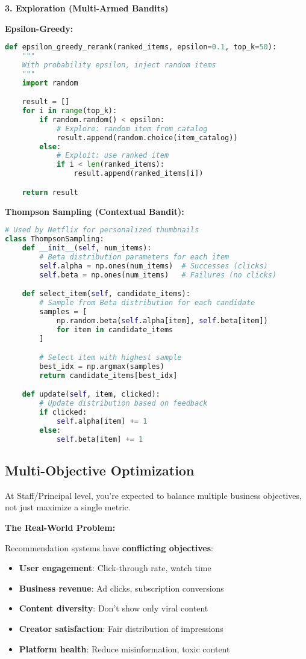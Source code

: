 \documentclass[10pt]{article}
\begin{document}
\textbf{3. Exploration (Multi-Armed Bandits)}

\textbf{Epsilon-Greedy:}
\begin{lstlisting}[language=Python]
def epsilon_greedy_rerank(ranked_items, epsilon=0.1, top_k=50):
    """
    With probability epsilon, inject random items
    """
    import random

    result = []
    for i in range(top_k):
        if random.random() < epsilon:
            # Explore: random item from catalog
            result.append(random.choice(item_catalog))
        else:
            # Exploit: use ranked item
            if i < len(ranked_items):
                result.append(ranked_items[i])

    return result
\end{lstlisting}

\textbf{Thompson Sampling (Contextual Bandit):}
\begin{lstlisting}[language=Python]
# Used by Netflix for personalized thumbnails
class ThompsonSampling:
    def __init__(self, num_items):
        # Beta distribution parameters for each item
        self.alpha = np.ones(num_items)  # Successes (clicks)
        self.beta = np.ones(num_items)   # Failures (no clicks)

    def select_item(self, candidate_items):
        # Sample from Beta distribution for each candidate
        samples = [
            np.random.beta(self.alpha[item], self.beta[item])
            for item in candidate_items
        ]

        # Select item with highest sample
        best_idx = np.argmax(samples)
        return candidate_items[best_idx]

    def update(self, item, clicked):
        # Update distribution based on feedback
        if clicked:
            self.alpha[item] += 1
        else:
            self.beta[item] += 1
\end{lstlisting}

\subsection{Multi-Objective Optimization}

At Staff/Principal level, you're expected to balance multiple business objectives, not just maximize a single metric.

\textbf{The Real-World Problem:}

Recommendation systems have \textbf{conflicting objectives}:
\begin{itemize}
\item \textbf{User engagement}: Click-through rate, watch time
\item \textbf{Business revenue}: Ad clicks, subscription conversions
\item \textbf{Content diversity}: Don't show only viral content
\item \textbf{Creator satisfaction}: Fair distribution of impressions
\item \textbf{Platform health}: Reduce misinformation, toxic content
\end{itemize}
\end{document}
